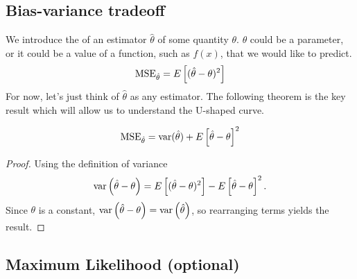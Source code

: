 


\subsection{Bias-variance tradeoff}

We introduce the  of an estimator $\hat{\theta}$ of some quantity $\theta$. $\theta$ could be a parameter, or it could be a value of a function, such as $f(x)$, that we would like to predict. 
\begin{equation}\label{eq:mse}
{\rm MSE}_{\hat{\theta}}= E\left[(\hat{\theta}- \theta)^2\right]
\end{equation}
 For now, let's just think of $\hat{\theta}$ as any estimator. 
The following theorem is the key result which will allow us to understand the U-shaped curve. 
\begin{thm}
\begin{equation}\label{eq:biasvar}
{\rm MSE}_{\hat{\theta}} = {\rm var}(\hat{\theta}) + E\left[\hat{\theta}-\theta\right]^2
\end{equation}
\end{thm}
\begin{proof}
Using the definition of variance 
\begin{equation*}
{\rm var}\left(\hat{\theta}-\theta\right) = E\left[(\hat{\theta}-\theta)^2\right] - E\left[\hat{\theta}-\theta\right]^2. 
\end{equation*}
Since $\theta$ is a constant, ${\rm var}\left(\hat{\theta}-\theta\right)= {\rm var}\left(\hat{\theta}\right)$, so 
rearranging terms yields the result. 
\end{proof}


\subsection{Maximum Likelihood (optional)}

